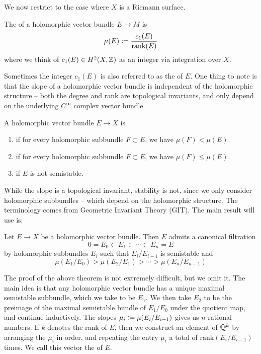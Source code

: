 We now restrict to the case where $X$ is a Riemann surface.
%
\begin{defn}
The  of a holomorphic vector bundle $E \to M$ is
\[
\mu(E) \vcentcolon= \frac{c_1(E)}{\mathrm{rank}(E)}
\]
where we think of $c_1(E) \in H^2(X,\mathbb{Z})$ as an integer via integration over $X$.
\end{defn}
%
Sometimes the integer $c_1(E)$ is also referred to as the  of $E$.
One thing to note is that the slope of a holomorphic vector bundle is
independent of the holomorphic structure -- both the degree and rank are
topological invariants, and only depend on the underlying $C^\infty$ complex
vector bundle.
%
\begin{defn}
A holomorphic vector bundle $E \to X$ is
\begin{enumerate}
  \item {} if for every holomorphic subbundle $F \subset E$,
  we have $\mu(F) < \mu(E)$.
  \item {} if for every holomorphic subbundle $F \subset E$,
  we have $\mu(F) \leq \mu(E)$.
  \item {} if $E$ is not semistable.
\end{enumerate}
\end{defn}
%
While the slope is a topological invariant, stability is not, since
we only consider holomorphic subbundles -- which depend on the holomorphic structure.
The terminology comes from Geometric Invariant Theory (GIT). The main
result will use is:
%
\begin{thm}
Let $E \to X$ be a holomorphic vector bundle. Then $E$ admits a canonical filtration
\[
0 = E_0 \subset E_1 \subset \cdots \subset E_n = E
\]
by holomorphic subbundles $E_i$ such that $E_i/E_{i-1}$ is semistable and
\[
\mu(E_1/E_0) > \mu(E_2/E_1) > \cdots > \mu(E_n/E_{n-1})
\]
\end{thm}
%
The proof of the above theorem is not extremely difficult, but we omit it.
The main idea is that any holomorphic vector bundle has a unique
maximal semistable subbundle, which we take to be $E_1$. We then take
$E_2$ to be the preimage of the maximal semistable bundle of $E_1/E_0$ under
the quotient map, and continue inductively. The slopes
$\mu_i \vcentcolon= \mu(E_i/E_{i-1})$ gives us $n$ rational numbers. If $k$ denotes
the rank of $E$, then we construct an element of $\mathbb{Q}^k$ by arranging
the $\mu_i$ in order, and repeating the entry $\mu_i$ a total of
$\mathrm{rank}(E_i/E_{i-1})$ times. We call this vector the
 of $E$. \\

